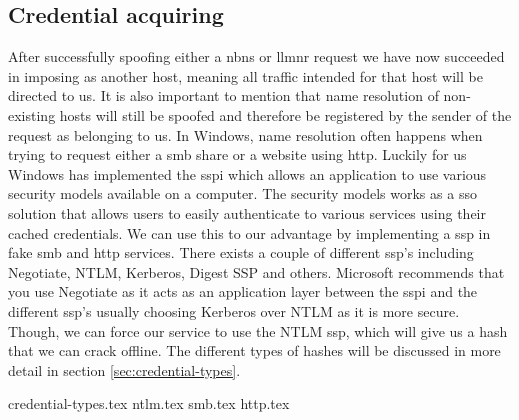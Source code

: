 \documentclass{article}
\begin{document}
\subsection{Credential acquiring}
\label{sec:credential-acquiring}
After successfully spoofing either a \gls{nbns} or \gls{llmnr} request we have now succeeded in imposing as another host, meaning all traffic intended for that host will be directed to us. It is also important to mention that name resolution of non-existing hosts will still be spoofed and therefore be registered by the sender of the request as belonging to us. In Windows, name resolution often happens when trying to request either a \gls{smb} share or a website using \gls{http}. Luckily for us Windows has implemented the \gls{sspi} which allows an application to use various security models available on a computer. The security models works as a \gls{sso} solution that allows users to easily authenticate to various services using their cached credentials\cite{url:microsoft:sspi-model}. We can use this to our advantage by implementing a \gls{ssp} in fake \gls{smb} and \gls{http} services. There exists a couple of different \gls{ssp}'s including Negotiate, NTLM, Kerberos, Digest SSP and others. Microsoft recommends that you use Negotiate as it acts as an application layer between the \gls{sspi} and the different \gls{ssp}'s usually choosing Kerberos over NTLM as it is more secure. Though, we can force our service to use the NTLM \gls{ssp}, which will give us a hash that we can crack offline. The different types of hashes will be discussed in more detail in section \ref{sec:credential-types}. 

{credential-types.tex}
{ntlm.tex}
{smb.tex}
{http.tex}
\end{document}
